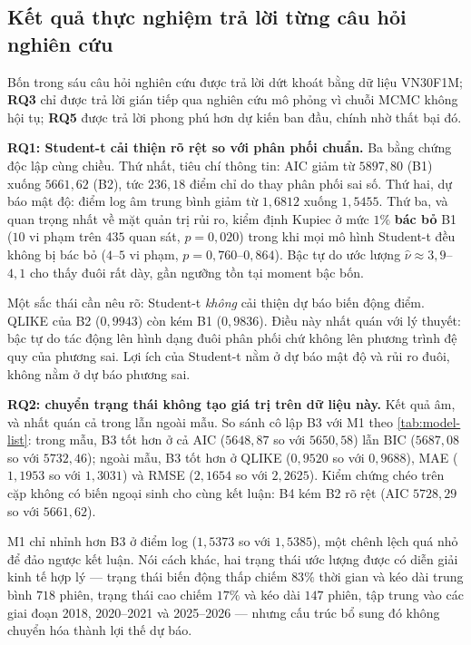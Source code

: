 \documentclass[12pt,a4paper]{article}
\numberwithin{equation}{section}
\newcommand{\RQ}[1]{\textbf{RQ#1}}
\begin{document}
\subsection{Kết quả thực nghiệm trả lời từng câu hỏi nghiên cứu}\label{subsec:tra-loi-rq}

Bốn trong sáu câu hỏi nghiên cứu được trả lời dứt khoát bằng dữ liệu VN30F1M; \RQ{3} chỉ được trả lời gián tiếp qua nghiên cứu mô phỏng vì chuỗi MCMC không hội tụ; \RQ{5} được trả lời phong phú hơn dự kiến ban đầu, chính nhờ thất bại đó.

\textbf{\RQ{1}: Student-t cải thiện rõ rệt so với phân phối chuẩn.} Ba bằng chứng độc lập cùng chiều. Thứ nhất, tiêu chí thông tin: AIC giảm từ $5897{,}80$ (B1) xuống $5661{,}62$ (B2), tức $236{,}18$ điểm chỉ do thay phân phối sai số. Thứ hai, dự báo mật độ: điểm log âm trung bình giảm từ $1{,}6812$ xuống $1{,}5455$. Thứ ba, và quan trọng nhất về mặt quản trị rủi ro, kiểm định Kupiec ở mức $1\%$ \textbf{bác bỏ} B1 ($10$ vi phạm trên $435$ quan sát, $p=0{,}020$) trong khi mọi mô hình Student-t đều không bị bác bỏ ($4$--$5$ vi phạm, $p=0{,}760$--$0{,}864$). Bậc tự do ước lượng $\hat\nu\approx 3{,}9$--$4{,}1$ cho thấy đuôi rất dày, gần ngưỡng tồn tại moment bậc bốn.

Một sắc thái cần nêu rõ: Student-t \emph{không} cải thiện dự báo biến động điểm. QLIKE của B2 ($0{,}9943$) còn kém B1 ($0{,}9836$). Điều này nhất quán với lý thuyết: bậc tự do tác động lên hình dạng đuôi phân phối chứ không lên phương trình đệ quy của phương sai. Lợi ích của Student-t nằm ở dự báo mật độ và rủi ro đuôi, không nằm ở dự báo phương sai.

\textbf{\RQ{2}: chuyển trạng thái không tạo giá trị trên dữ liệu này.} Kết quả âm, và nhất quán cả trong lẫn ngoài mẫu. So sánh cô lập B3 với M1 theo \cref{tab:model-list}: trong mẫu, B3 tốt hơn ở cả AIC ($5648{,}87$ so với $5650{,}58$) lẫn BIC ($5687{,}08$ so với $5732{,}46$); ngoài mẫu, B3 tốt hơn ở QLIKE ($0{,}9520$ so với $0{,}9688$), MAE ($1{,}1953$ so với $1{,}3031$) và RMSE ($2{,}1654$ so với $2{,}2625$). Kiểm chứng chéo trên cặp không có biến ngoại sinh cho cùng kết luận: B4 kém B2 rõ rệt (AIC $5728{,}29$ so với $5661{,}62$).

M1 chỉ nhỉnh hơn B3 ở điểm log ($1{,}5373$ so với $1{,}5385$), một chênh lệch quá nhỏ để đảo ngược kết luận. Nói cách khác, hai trạng thái ước lượng được có diễn giải kinh tế hợp lý --- trạng thái biến động thấp chiếm $83\%$ thời gian và kéo dài trung bình $718$ phiên, trạng thái cao chiếm $17\%$ và kéo dài $147$ phiên, tập trung vào các giai đoạn 2018, 2020--2021 và 2025--2026 --- nhưng cấu trúc bổ sung đó không chuyển hóa thành lợi thế dự báo.
\end{document}
